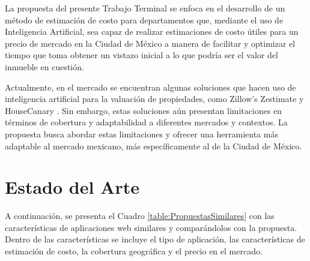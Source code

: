 La propuesta del presente Trabajo Terminal se enfoca en el desarrollo de un
método de estimación de costo para departamentos que, mediante el uso de
Inteligencia Artificial, sea capaz de realizar estimaciones de costo útiles
para un precio de mercado en la Ciudad de México a manera de facilitar y
optimizar el tiempo que toma obtener un vistazo inicial a lo que podría ser el
valor del inmueble en cuestión.

Actualmente, en el mercado se encuentran algunas soluciones que hacen uso de
inteligencia artificial para la valuación de propiedades,
como Zillow's Zestimate \cite{zillow2023} y HouseCanary \cite{housecanary2021}.
Sin embargo, estas soluciones aún presentan limitaciones en términos de cobertura
y adaptabilidad a diferentes
mercados y contextos. La propuesta busca abordar estas limitaciones y ofrecer
una herramienta más adaptable al mercado mexicano, más específicamente al de la
Ciudad de México.

\section{Estado del Arte}
A continuación, se presenta el Cuadro \ref{table:PropuestasSimilares} con las
características de aplicaciones web similares y comparándolos con la propuesta.
Dentro de las características se incluye el tipo de aplicación, las características
de estimación de costo, la cobertura geográfica y el precio en el mercado.

